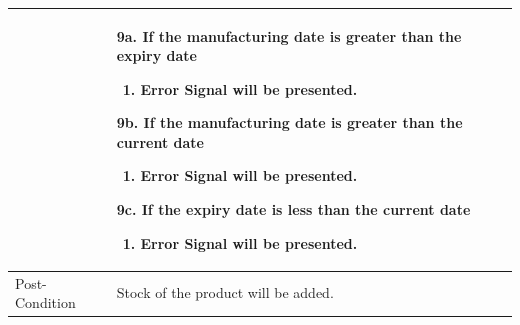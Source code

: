 \documentclass[12pt,a4paper]{report}
\begin{document}
\begin{tabular}{ | m{3cm} | m{12cm}| } \hline
& 9a. If the manufacturing date is greater than the expiry date
	\begin{enumerate}
		\item Error Signal will be presented.
	\end{enumerate}
9b. If the manufacturing date is greater than the current date
	\begin{enumerate}
		\item Error Signal will be presented.
	\end{enumerate}
9c. If the expiry date is less than the current date
	\begin{enumerate}
		\item Error Signal will be presented.
	\end{enumerate}
\\ \hline
Post-Condition &  Stock of the product will be added. \\ \hline
\end{tabular}
\end{document}
